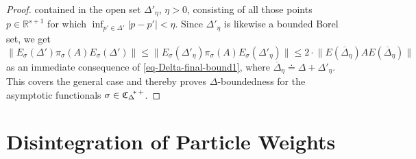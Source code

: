\documentclass[11pt,twoside,openright]{report}
\theoremstyle{definition}
\theoremstyle{plain}
\theoremstyle{remark}
\theoremstyle{assumption}
\newcommand{\abs}[1]{\lvert #1 \rvert}
\newcommand{\norm}[1]{\lVert #1 \rVert}
\newcommand{\Rsone}{\mathbb{R}^{s + 1}}
\newcommand{\Deltaetabar}{\overline{\Delta}_\eta}
\newcommand{\EDetabar}{E ( \overline{\Delta}_\eta )}
\newcommand{\EsDprime}{E_\sigma ( \Delta' )}
\newcommand{\EsDprimeeta}{E_\sigma ( \Delta'_\eta )}
\newcommand{\CDstarplus}{{\mathfrak{C}_\Delta}^{\negthickspace *
    \thinspace +}}
\begin{document}
\begin{proof}
  contained in the open set $\Delta'_\eta$, $\eta > 0$, consisting of
  all those points $p \in \Rsone$ for which $\inf_{p' \in \Delta'}
  \abs{p - p'} < \eta$. Since $\Delta'_\eta$ is likewise a bounded
  Borel set, we get
  \begin{equation}
    \label{eq-Delta-final-bound2}
    \norm{\EsDprime \pi_\sigma ( A ) \EsDprime} \leqslant
    \norm{\EsDprimeeta \pi_\sigma ( A ) \EsDprimeeta} \leqslant 2
    \cdot \norm{\EDetabar A \EDetabar}
  \end{equation}
  as an immediate consequence of \eqref{eq-Delta-final-bound1}, where
  $\Deltaetabar \doteq \Delta + \Delta'_\eta$. This covers the general
  case and thereby proves $\Delta$-boundedness for the asymptotic
  functionals $\sigma \in \CDstarplus$.
\end{proof}


\chapter{Disintegration of Particle Weights}
  \label{chap-disintegration}

\label{cit-prokrustes}
\renewcommand{\thefootnote}{\fnsymbol{footnote}}
\hspace*{\fill}
\vspace{1cm}
\end{document}
